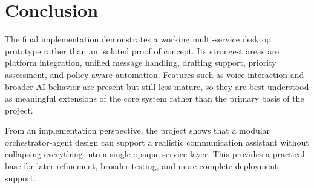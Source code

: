 \section{Conclusion}
The final implementation demonstrates a working multi-service desktop prototype rather than an isolated proof of concept. Its strongest areas are platform integration, unified message handling, drafting support, priority assessment, and policy-aware automation. Features such as voice interaction and broader AI behavior are present but still less mature, so they are best understood as meaningful extensions of the core system rather than the primary basis of the project.

From an implementation perspective, the project shows that a modular orchestrator-agent design can support a realistic communication assistant without collapsing everything into a single opaque service layer. This provides a practical base for later refinement, broader testing, and more complete deployment support.
